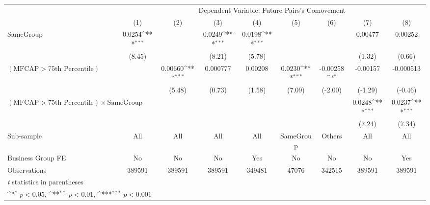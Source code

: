 {
\def\sym#1{\ifmmode^{#1}\else\(^{#1}\)\fi}
\begin{tabular}{l*{8}{c}}
\hline\hline
                &\multicolumn{8}{c}{Dependent Variable:  Future Pairs's Comovement}                                                                                     \\\cmidrule(lr){2-9}
                &\multicolumn{1}{c}{(1)}         &\multicolumn{1}{c}{(2)}         &\multicolumn{1}{c}{(3)}         &\multicolumn{1}{c}{(4)}         &\multicolumn{1}{c}{(5)}         &\multicolumn{1}{c}{(6)}         &\multicolumn{1}{c}{(7)}         &\multicolumn{1}{c}{(8)}         \\
\hline
SameGroup       &   0.0254\sym{***}&                  &   0.0249\sym{***}&   0.0198\sym{***}&                  &                  &  0.00477         &  0.00252         \\
                &   (8.45)         &                  &   (8.21)         &   (5.78)         &                  &                  &   (1.32)         &   (0.66)         \\
[1em]
$ (\text{MFCAP} > \text{75th Percentile}) $ &                  &  0.00660\sym{***}& 0.000777         &  0.00208         &   0.0230\sym{***}& -0.00258\sym{*}  & -0.00157         &-0.000513         \\
                &                  &   (5.48)         &   (0.73)         &   (1.58)         &   (7.09)         &  (-2.00)         &  (-1.29)         &  (-0.46)         \\
[1em]
 $ (\text{MFCAP} > \text{75th Percentile}) \times {\text{SameGroup}} $ &                  &                  &                  &                  &                  &                  &   0.0248\sym{***}&   0.0237\sym{***}\\
                &                  &                  &                  &                  &                  &                  &   (7.24)         &   (7.34)         \\
\hline
Sub-sample      &      All         &      All         &      All         &      All         &SameGroup         &   Others         &      All         &      All         \\
Business Group FE&       No         &       No         &       No         &      Yes         &       No         &       No         &       No         &      Yes         \\
Observations    &   389591         &   389591         &   389591         &   349481         &    47076         &   342515         &   389591         &   389591         \\
\hline\hline
\multicolumn{9}{l}{\footnotesize \textit{t} statistics in parentheses}\\
\multicolumn{9}{l}{\footnotesize \sym{*} \(p<0.05\), \sym{**} \(p<0.01\), \sym{***} \(p<0.001\)}\\
\end{tabular}
}
